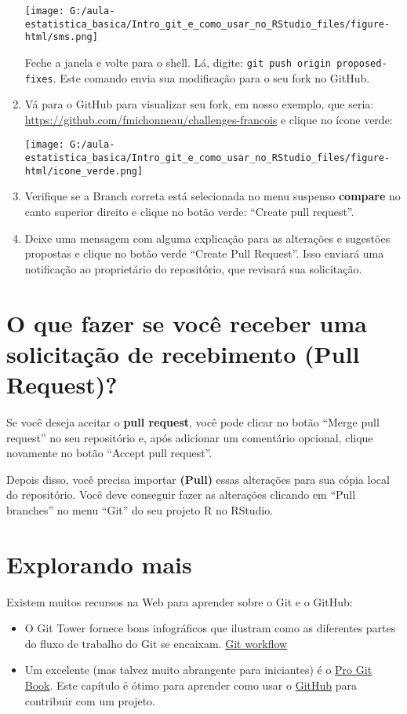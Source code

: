 \documentclass[]{book}
\providecommand{\tightlist}{%
  \setlength{\itemsep}{0pt}\setlength{\parskip}{0pt}}
\begin{document}
\begin{enumerate}
  \texttt{[image: G:/aula-estatistica\_basica/Intro\_git\_e\_como\_usar\_no\_RStudio\_files/figure-html/sms.png]}

  Feche a janela e volte para o shell. Lá, digite:
  \texttt{git\ push\ origin\ proposed-fixes}.
  Este comando envia sua modificação para o seu fork no GitHub.
\item
  Vá para o GitHub para visualizar seu fork, em nosso exemplo, que seria:
  \url{https://github.com/fmichonneau/challenges-francois} e clique no ícone verde:

  \texttt{[image: G:/aula-estatistica\_basica/Intro\_git\_e\_como\_usar\_no\_RStudio\_files/figure-html/icone\_verde.png]}
\item
  Verifique se a Branch correta está selecionada no menu suspenso \textbf{compare} no canto superior direito e clique no botão verde: ``Create pull request''.
\item
  Deixe uma mensagem com alguma explicação para as alterações e sugestões propostas e clique no botão verde ``Create Pull Request''. Isso enviará uma notificação ao proprietário do repositório, que revisará sua solicitação.
\end{enumerate}

\hypertarget{o-que-fazer-se-voce-receber-uma-solicitacao-de-recebimento-pull-request}{%
\section{O que fazer se você receber uma solicitação de recebimento (Pull Request)?}\label{o-que-fazer-se-voce-receber-uma-solicitacao-de-recebimento-pull-request}}

Se você deseja aceitar o \textbf{pull request}, você pode clicar no botão ``Merge pull request'' no seu repositório e, após adicionar um comentário opcional, clique novamente no botão ``Accept pull request''.

Depois disso, você precisa importar \textbf{(Pull)} essas alterações para sua cópia local do repositório. Você deve conseguir fazer as alterações clicando em ``Pull branches'' no menu ``Git'' do seu projeto R no RStudio.

\hypertarget{explorando-mais}{%
\section{Explorando mais}\label{explorando-mais}}

Existem muitos recursos na Web para aprender sobre o Git e o GitHub:

\begin{itemize}
\tightlist
\item
  O Git Tower fornece bons infográficos que ilustram como as diferentes partes do fluxo de trabalho do Git se encaixam. \href{https://www.git-tower.com/blog/workflow-of-git}{Git workflow}
\item
  Um excelente (mas talvez muito abrangente para iniciantes) é o \href{https://git-scm.com/book/en/v2}{Pro Git Book}. Este capítulo é ótimo para aprender como usar o \href{https://git-scm.com/book/en/v2/GitHub-Contributing-to-a-Project}{GitHub} para contribuir com um projeto.
\end{itemize}
\end{document}

